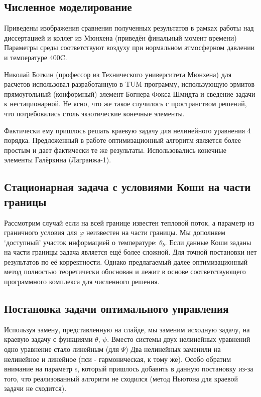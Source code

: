 \documentclass[8pt,a4paper]{article}
\begin{document}
    \subsection*{Численное моделирование}
    Приведены изображения сравнения полученных результатов в рамках работы
    над диссертацией и коллег из Мюнхена (приведён финальный момент времени)
    Параметры среды соответствуют воздуху при нормальном атмосферном давлении и температуре 400C.


    Николай Боткин (профессор из Технического университета Мюнхена)
    для расчетов использовал разработанную в TUM программу, использующую
    эрмитов прямоугольный (конформный) элемент Богнера-Фокса-Шмидта и сведение задачи к нестационарной.
    Не ясно, что же такое случилось с пространством решений, что потребовались столь экзотические конечные элементы.

    Фактически ему пришлось решать краевую задачу для нелинейного уравнения 4 порядка.
    Предложенный в работе оптимизационный алгоритм является более простым и дает фактически те же результаты.
    Использовались конечные элементы Галёркина (Лагранжа-1).

    \subsection*{Стационарная задача с условиями Коши на части границы}
    Рассмотрим случай если на всей границе известен тепловой поток, а параметр из граничного условия
    для $\varphi$ неизвестен на части границы.
    Мы дополняем `доступный' участок информацией о температуре: $\theta_b$.
    Если данные Коши заданы на части границы задача является ещё более сложной.
    Для точной постановки нет результатов по её корректности.
    Однако предлагаемый далее оптимизационный метод полностью теоретически обоснован и
    лежит в основе соответствующего программного комплекса для численного решения.

    \subsection*{Постановка задачи оптимального управления}
    Используя замену, представленную на слайде, мы заменим исходную задачу, на краевую задачу
    с функциями $\theta$, $\psi$.
    Вместо системы двух нелинейных уравнений одно уравнение стало линейным (для $\Psi$)
    Два нелинейных заменили на нелинейное и линейное (пси - гармоническая, к тому же).
    Особо обратим внимание на параметр s, который пришлось добавить в данную постановку из-за
    того, что реализованный алгоритм не сходился (метод Ньютона для краевой задачи не сходится).
\end{document}
